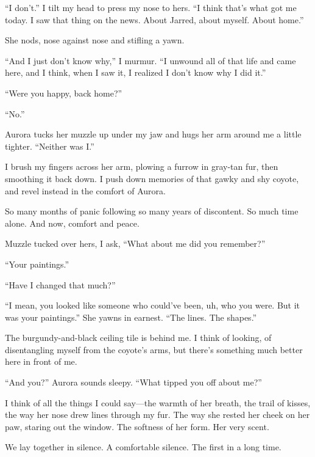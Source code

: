 ``I don't.'' I tilt my head to press my nose to hers. ``I think that's what got me today. I saw that thing on the news. About Jarred, about myself. About home.''

She nods, nose against nose and stifling a yawn.

``And I just don't know why,'' I murmur. ``I unwound all of that life and came here, and I think, when I saw it, I realized I don't know why I did it.''

``Were you happy, back home?''

``No.''

Aurora tucks her muzzle up under my jaw and hugs her arm around me a little tighter. ``Neither was I.''

I brush my fingers across her arm, plowing a furrow in gray-tan fur, then smoothing it back down. I push down memories of that gawky and shy coyote, and revel instead in the comfort of Aurora.

So many months of panic following so many years of discontent. So much time alone. And now, comfort and peace.

Muzzle tucked over hers, I ask, ``What about me did you remember?''

``Your paintings.''

``Have I changed that much?''

``I mean, you looked like someone who could've been, uh, who you were. But it was your paintings.'' She yawns in earnest. ``The lines. The shapes.''

The burgundy-and-black ceiling tile is behind me. I think of looking, of disentangling myself from the coyote's arms, but there's something much better here in front of me.

``And you?'' Aurora sounds sleepy. ``What tipped you off about me?''

I think of all the things I could say---the warmth of her breath, the trail of kisses, the way her nose drew lines through my fur. The way she rested her cheek on her paw, staring out the window. The softness of her form. Her very scent.

We lay together in silence. A comfortable silence. The first in a long time.

